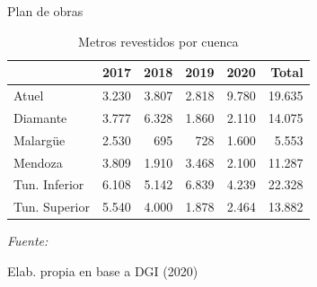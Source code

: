 \documentclass{beamer}\usepackage[]{graphicx}\usepackage[]{color}
\newenvironment{knitrout}{}{} %
\begin{document}
\begin{frame}{Plan de obras}
\begin{knitrout}
\color{fgcolor}\begin{table}[H]

\caption{\label{tab:Revestimiento}\label{Revestimiento}Metros revestidos por cuenca}
\centering
\fontsize{10}{12}\selectfont
\begin{threeparttable}
\begin{tabular}[t]{llrrrr}
\toprule
  & 2017 & 2018 & 2019 & 2020 & Total\\
\midrule
Atuel & 3.230 & 3.807 & 2.818 & 9.780 & 19.635\\
Diamante & 3.777 & 6.328 & 1.860 & 2.110 & 14.075\\
Malargüe & 2.530 & 695 & 728 & 1.600 & 5.553\\
Mendoza & 3.809 & 1.910 & 3.468 & 2.100 & 11.287\\
Tun. Inferior & 6.108 & 5.142 & 6.839 & 4.239 & 22.328\\
Tun. Superior & 5.540 & 4.000 & 1.878 & 2.464 & 13.882\\
\bottomrule
\end{tabular}
\begin{tablenotes}[para]
\item \textit{Fuente: } 
\item Elab. propia en base a DGI (2020)
\end{tablenotes}
\end{threeparttable}
\end{table}


\end{knitrout}




\end{frame}
\end{document}

